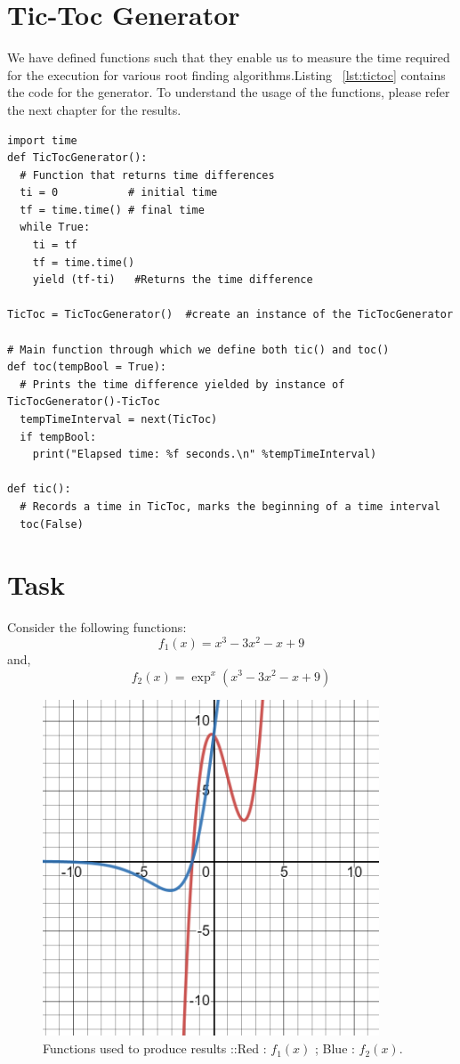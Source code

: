 \documentclass[a4paper, 12pt]{report}
\begin{document}
\section{Tic-Toc Generator}
We have defined functions such that they enable us to measure the time required for the execution for various root finding algorithms.Listing ~\ref{lst:tictoc} contains the code for the generator. To understand the usage of the functions, please refer the next chapter for the results.
\begin{lstlisting}
import time
def TicTocGenerator():
  # Function that returns time differences
  ti = 0           # initial time
  tf = time.time() # final time
  while True:
    ti = tf
    tf = time.time()
    yield (tf-ti)   #Returns the time difference

TicToc = TicTocGenerator()  #create an instance of the TicTocGenerator

# Main function through which we define both tic() and toc()
def toc(tempBool = True):
  # Prints the time difference yielded by instance of TicTocGenerator()-TicToc
  tempTimeInterval = next(TicToc)
  if tempBool:
    print("Elapsed time: %f seconds.\n" %tempTimeInterval)

def tic():
  # Records a time in TicToc, marks the beginning of a time interval
  toc(False)
\end{lstlisting}
\section{Task}
Consider the following functions:
\begin{equation}
    f_{1}(x) = x^{3} - 3 x^{2} - x + 9
\end{equation}
and,
\begin{equation}
    f_{2}(x) = \exp^{x}(x^{3} - 3 x^{2} - x + 9)
\end{equation}
\begin{figure}[h]
    \centering
    \includegraphics[width=10cm]{Funcs.png}
    \caption{Functions used to produce results ::Red : $f_{1}(x)$ ; Blue : $f_{2}(x)$.}
    \label{fig:Funcs}
    \end{figure}
    
\end{document}

